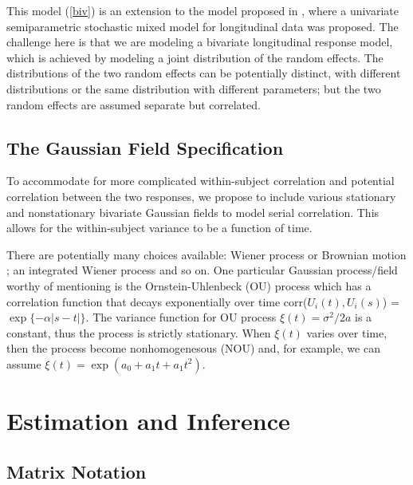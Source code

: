 \documentclass[article,lineno]{biometrika}
\begin{document}
This model (\ref{biv}) is an extension to the model proposed in \citet {Zhang:1998}, where a univariate semiparametric stochastic mixed model for longitudinal data was proposed. The challenge here is that we are modeling a bivariate longitudinal response model, which  is achieved  by modeling a joint distribution of the random effects. The distributions of the two random effects can be potentially distinct, with different distributions or the same distribution with different parameters; but the two random effects are  assumed separate but correlated. 


\subsection{The Gaussian Field Specification}

To accommodate for more complicated within-subject correlation and potential correlation between the two responses, we propose to include various stationary and nonstationary bivariate Gaussian fields to model serial correlation. This allows for the within-subject variance to be a function of time. 

There are potentially many choices available: Wiener process or Brownian motion \citep{Tayl:Cumb:Sy:quan:1994}; an integrated Wiener process and so on. One particular Gaussian process/field worthy of mentioning is the Ornstein-Uhlenbeck (OU) process \citep{Koralov:2007} which has a correlation function that decays exponentially over time corr($U_i(t), U_i(s)$) = $\exp\{-\alpha|s-t|\}$. The variance function for OU process $\xi(t) = \sigma^2/2a$ is a constant, thus the process is strictly stationary. When $\xi(t)$ varies over time, then the process become nonhomogenesous (NOU) and, for example, we can assume $\xi(t) = \exp(a_0 + a_1 t + a_1 t^2)$. 

%
%
%

\section{Estimation and Inference} \label{est}

\subsection{Matrix Notation} \label{MatrixNotation}
\end{document}
